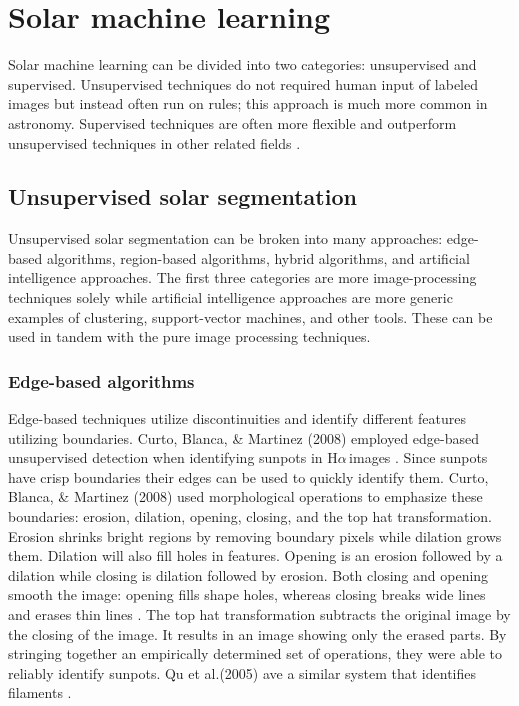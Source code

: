 \documentclass[twoside]{report}
\newcommand{\halpha}{H$\alpha$\,}
\begin{document}
\section{Solar machine learning}
Solar machine learning can be divided into two categories: unsupervised and supervised. Unsupervised techniques do not required human input of labeled images but instead often run on rules; this approach is much more common in astronomy. Supervised techniques are often more flexible and outperform unsupervised techniques in other related fields \cite{anzanello:2014, yu:2013,guerra:2011, huang:2017}.

\subsection{Unsupervised solar segmentation} \label{sec:unsupervised}
Unsupervised solar segmentation can be broken into many approaches: edge-based algorithms, region-based algorithms, hybrid algorithms, and artificial intelligence approaches. The first three categories are more image-processing techniques solely while artificial intelligence approaches are more generic examples of clustering, support-vector machines, and other tools. These can be used in tandem with the pure image processing techniques. 

\subsubsection{Edge-based algorithms}
Edge-based techniques utilize discontinuities and identify different features utilizing boundaries. Curto, Blanca, \& Martinez (2008) employed edge-based unsupervised detection when identifying sunpots in \halpha images \cite{curto2008automatic}. Since sunpots have crisp boundaries their edges can be used to quickly identify them. Curto, Blanca, \& Martinez (2008) used morphological operations to emphasize these boundaries: erosion, dilation, opening, closing, and the top hat transformation. Erosion shrinks bright regions by removing boundary pixels while dilation grows them. Dilation will also fill holes in features. Opening is an erosion followed by a dilation while closing is dilation followed by erosion. Both closing and opening smooth the image: opening fills shape holes, whereas closing breaks wide lines and erases thin lines \cite{curto2008automatic}. The top hat transformation subtracts the original image by the closing of the image. It results in an image showing only the erased parts. By stringing together an empirically determined set of operations, they were able to reliably identify sunpots. Qu et al.(2005) ave a similar system that identifies filaments \cite{qu2005automatic}. 
\end{document}
